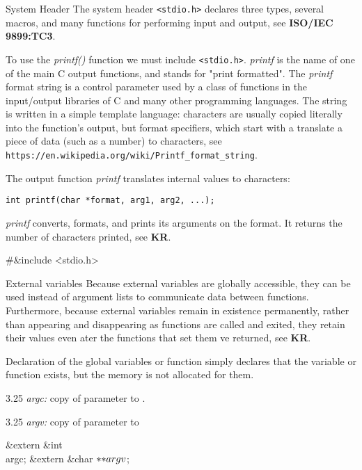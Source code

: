 \fi

System Header \hfill \break
The system header {\tt <stdio.h>} declares three types, several macros, and
many functions for performing input and output, see {\bf ISO/IEC 9899:TC3}.

\vskip 2pt \noindent
To use the {\sl printf()} function we must include {\tt <stdio.h>}.
{\sl printf} is the name of one of the main C output functions, and stands for
"print formatted". The {\sl printf} format string is a control parameter used
by
a class of functions in the input/output libraries of C and many other
programming languages. The string is written in a simple template language:
characters are usually copied literally into the function's output, but format
specifiers, which start with a %
translate a piece of data (such as a number) to characters, see
{\tt https://en.wikipedia.org/wiki/Printf\_format\_string}.

\vskip 2pt \noindent
The output function {\sl printf} translates internal values to characters:

\vskip 2pt \noindent
{\tt int printf(char *format, arg1, arg2, ...); }

\vskip 2pt \noindent
{\sl printf} converts, formats, and prints its arguments on the
format. It returns the number of characters printed, see {\bf KR}.

\Y\B\8\#\&{include} \.{<stdio.h>}\par
\fi

External variables \hfill \break
Because external variables are globally accessible, they can be used instead of
argument lists to communicate data between functions. Furthermore, because
external variables remain in existence permanently, rather than appearing and
disappearing as functions are called and exited, they retain their values even
ater the functions that set them ve returned, see {\bf KR}.

Declaration of the global variables or function simply declares that the
variable or function exists, but the memory is not allocated for them.

\vskip 2pt
 3.25 {\sl argc:} copy of  parameter to .

 3.25 {\sl argv:}  copy of  parameter to 

\Y\B\&{extern} \&{int} \\{argc};\6
\&{extern} \&{char} ${}{*}{*}\\{argv}{}$;\par
\fi

